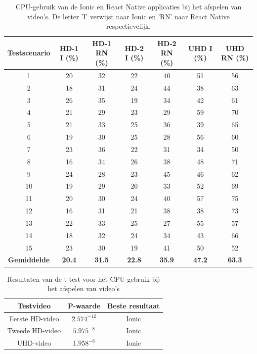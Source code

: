 \begin{table}[htbp]
  \centering
  \footnotesize
  \begin{tabular}{|c|c|c|c|c|c|c|}
      \hline
      \textbf{Testscenario} & \textbf{HD-1 I (\%)} & \textbf{HD-1 RN (\%)} & \textbf{HD-2 I (\%)} & \textbf{HD-2 RN (\%)} & \textbf{UHD I (\%)} & \textbf{UHD RN (\%)} \\
      \hline
      1 & 20 & 32 & 22 & 40 & 51 & 56 \\
      \hline
      2 & 18 & 31 & 24 & 44 & 38 & 63 \\
      \hline
      3 & 26 & 35 & 19 & 34 & 42 & 61 \\
      \hline
      4 & 21 & 29 & 23 & 29 & 59 & 70 \\
      \hline
      5 & 21 & 33 & 25 & 36 & 39 & 65 \\
      \hline
      6 & 19 & 30 & 25 & 28 & 56 & 60 \\
      \hline
      7 & 23 & 36 & 22 & 31 & 34 & 50 \\
      \hline
      8 & 16 & 34 & 26 & 38 & 48 & 71 \\
      \hline
      9 & 24 & 28 & 23 & 45 & 46 & 62 \\
      \hline
      10 & 19 & 29 & 20 & 33 & 52 & 69 \\
      \hline
      11 & 20 & 30 & 24 & 40 & 57 & 75 \\
      \hline
      12 & 16 & 31 & 21 & 38 & 38 & 73 \\
      \hline
      13 & 22 & 33 & 25 & 27 & 55 & 57 \\
      \hline
      14 & 18 & 32 & 24 & 34 & 43 & 66 \\
      \hline
      15 & 23 & 30 & 19 & 41 & 50 & 52 \\
      \hline
      \textbf{Gemiddelde} & \textbf{20.4} & \textbf{31.5} & \textbf{22.8} & \textbf{35.9} & \textbf{47.2} & \textbf{63.3} \\
      \hline
  \end{tabular}
  \caption{CPU-gebruik van de Ionic en React Native applicaties bij het afspelen van video's. De letter 'I' verwijst naar Ionic en 'RN' naar React Native respectievelijk.}
  \label{tab:cpu2}
\end{table}

\begin{table}[htbp]
  \centering
  \footnotesize
  \begin{tabular}{|c|c|c|}
      \hline
      \textbf{Testvideo} & \textbf{P-waarde} & \textbf{Beste resultaat} \\
      \hline
      Eerste HD-video & \(2.574^{-12}\) & Ionic \\
      \hline
      Tweede HD-video & \(5.975^{-8}\) & Ionic \\
      \hline
      UHD-video & \(1.958^{-6}\) & Ionic \\
      \hline
  \end{tabular}
  \caption{Resultaten van de t-test voor het CPU-gebruik bij het afspelen van video's}
  \label{tab:cpu_ttest}
\end{table}

